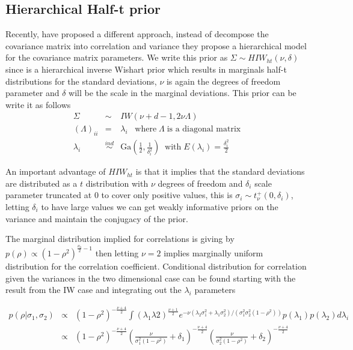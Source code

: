 \documentclass{article}
\begin{document}
\subsection{Hierarchical Half-t prior}

Recently, \cite{huang2013simple} have proposed a different approach, instead of decompose the covariance matrix into correlation and variance they propose a hierarchical model for the covariance matrix parameters. We write this prior as $\Sigma \sim HIW_{ht}(\nu, \delta)$ since is a hierarchical inverse Wishart prior which results in marginals half-t distributions for the standard deviations, $\nu$ is again the degrees of freedom parameter and $\delta$ will be the scale in the marginal deviations.   This prior can be write it as follows
\begin{eqnarray}
\nonumber \Sigma &\sim& IW( \nu + d - 1 ,  2\nu\Lambda) \\
\nonumber  (\Lambda)_{ii} &=& \lambda_i  \;\; \; \mbox{where} \; \Lambda \; \mbox{is a diagonal matrix} \\
 \lambda_i & \stackrel{ind} \sim& \mbox{Ga}(\frac{1}{2} , \frac{1}{\delta_i^2}) \;\; \mbox{with} \; E(\lambda_i)=\frac{\delta_i^2}{2} 
\label{eq:ht}
\end{eqnarray}

An important advantage of  $HIW_{ht}$ is that it implies that the standard deviations are distributed as a $t$ distribution with $\nu$ degrees of freedom and $\delta_i$ scale parameter truncated at 0 to cover only positive values, this is $\sigma_i \sim t_{\nu}^{+}(0, \delta_i)$, letting $\delta_i$ to have large values we can get weakly informative priors on the variance and maintain the conjugacy of the prior.  

The marginal distribution implied for correlations is giving by $p(\rho) \propto (1-\rho^2)^{\frac{\nu_0}{2}-1}$ then letting $\nu=2$ implies marginally uniform distribution for the correlation coefficient.  Conditional distribution for correlation given the variances in the two dimensional case can be found starting with the result from the IW case and integrating out the $\lambda_i$ parameters

\begin{eqnarray}
\nonumber p(\rho \vert \sigma_1,\sigma_2) &\propto & 
(1-\rho^2)^{-\frac{\nu+4}{2}} \int (\lambda_1\lambda2)^{\frac{\nu+1}{2}}e^{-\nu(\lambda_{2} \sigma_1^2+\lambda_{1}\sigma_2^2)/(\sigma_1^2 \sigma_2^2(1-\rho^2)) }p(\lambda_1)p(\lambda_2) d\lambda_i  \\ 
\nonumber  &\propto &  (1-\rho^2)^{-\frac{\nu+4}{2}} (\frac{\nu}{\sigma_1^2(1-\rho^2)} + \delta_1)^{-\frac{\nu+4}{2}} (\frac{\nu}{\sigma_2^2(1-\rho^2)} + \delta_2)^{-\frac{\nu+4}{2}}
\end{eqnarray}
\end{document}
